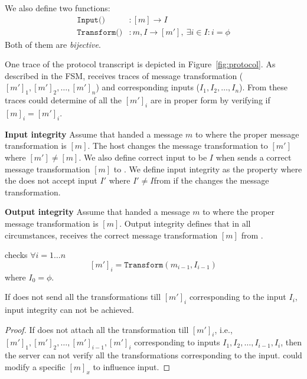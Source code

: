 We also define two functions:
\begin{align*}
\texttt{Input()}&:[m]\rightarrow I \\
\texttt{Transform()}&:m,I\rightarrow [m'],\ \exists i\in I:i=\phi
\end{align*}
Both of them are \emph{bijective}.

One trace of the protocol transcript is depicted in Figure~\ref{fig:protocol}. As described in the FSM, \server receives traces of message transformation ($[m']_1,[m']_2,\ldots,[m']_n$) and corresponding inputs ($I_1,I_2,\ldots,I_n$). From these traces \server could determine of all the $[m']_i$ are in proper form by verifying if $[m]_i=[m']_i$.

\begin{definition}{\textbf{Input integrity}}
\label{def:inputIntegrity}
Assume that \server handed a message $m$ to \host where the proper message transformation is $[m]$. The host changes the message transformation to $[m']$ where $[m']\neq [m]$. We also define correct \user input to be $I$ when \host sends a correct message transformation $[m]$ to \user. We define input integrity as the property where the \server does not accept input $I'$ where $I'\neq I$from \user if the \host changes the message transformation.
\end{definition}

\begin{definition}{\textbf{Output integrity}}
\label{def:outputIntegrity}
Assume that \server handed a message $m$ to \host where the proper message transformation is $[m]$. Output integrity defines that in all circumstances, \user receives the correct message transformation $[m]$ from \host.
\end{definition}

 \server checks $\forall i=1\ldots n$ $$[m']_i = \texttt{Transform}(m_{i-1}, I_{i-1})$$ where $I_0=\phi$.

\begin{theorem}
\label{theorem:th1}
If \user does not send all the transformations till $[m']_i$ corresponding to the input $I_i$, input integrity can not be achieved. 
\end{theorem}

\begin{proof}
If \user does not attach all the transformation till $[m']_i$, i.e., $[m']_1, [m']_2, \ldots, [m']_{i-1}, [m']_i$  corresponding to inputs $I_1, I_2,\ldots, I_{i-1}, I_i$, then the server can not verify all the transformations corresponding to the input. \host could modify a specific $[m]_x$ to influence \user input.
\end{proof}

